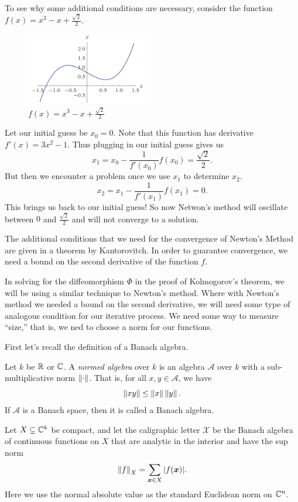 \documentclass[twoside,letterpaper,10pt]{article}
\numberwithin{equation}{section}
\begin{document}
To see why some additional conditions are necessary, consider the function $f(x)
= x^3 - x + \frac{\sqrt{2}}{2}$.
\begin{figure}
  \begin{center}
    \includegraphics[width=0.48\textwidth]{newtonfail}
  \end{center}
  \caption{$f(x) = x^3 - x + \frac{\sqrt{2}}{2}$}
\end{figure}
Let our initial guess be $x_0 = 0$.
Note that this function has derivative $f'(x) = 3x^2 - 1$.
Thus plugging in our initial guess gives us
\begin{equation*}
  x_1 = x_0 - \frac{1}{f'(x_0)} f(x_0) = \frac{\sqrt{2}}{2}.
\end{equation*}
But then we encounter a problem once we use $x_1$ to determine $x_2$.
\begin{equation*}
  x_2 = x_1 - \frac{1}{f'(x_1)} f(x_1) = 0.
\end{equation*}
This brings us back to our initial guess!
So now Netwon's method will oscillate between $0$ and $\frac{\sqrt{2}}{2}$ and
will not converge to a solution.

The additional conditions that we need for the convergence of Newton's Method
are given in a theorem by Kantorovitch.
In order to guarantee convergence, we need a bound on the second derivative of
the function $f$.

In solving for the diffeomorphism $\Phi$ in the proof of Kolmogorov's theorem,
we will be using a similar technique to Newton's method.
Where with Newton's method we needed a bound on the second derivative, we will
need some type of analogous condition for our iterative process.
We need some way to measure ``size,'' that is, we ned to choose a norm for our
functions.

First let's recall the definition of a Banach algebra.
\begin{defn}
  Let $k$ be $\mathbb{R}$ or $\mathbb{C}$.
  A \emph{normed algebra} over $k$ is an algebra $\mathcal{A}$ over $k$ with a
  sub-multiplicative norm $\norm{\cdot}$.
  That is, for all $x, y \in \mathcal{A}$, we have
  \begin{equation*}
    \norm{xy} \leq \norm{x}\norm{y}.
  \end{equation*}
  If $\mathcal{A}$ is a Banach space, then it is called a Banach algebra.
\end{defn}
Let $X \subseteq \mathbb{C}^k$ be compact, and let the caligraphic letter $\mathcal{X}$
be the Banach algebra of continuous functions on $X$ that are analytic in the
interior and have the sup norm
\begin{equation*}
  \norm{f}_X = \sum_{\bp{x} \in X} |f(\bp{x})|.
\end{equation*}
Here we use the normal absolute value as the standard Euclidean norm on $\mathbb{C}^n$.
\end{document}
